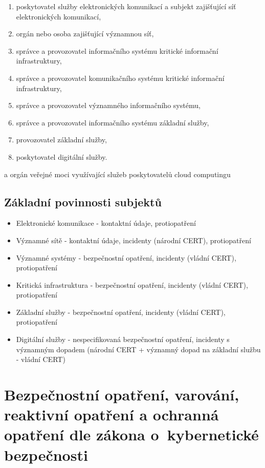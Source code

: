 \begin{enumerate}[label=\alph*)]
\item poskytovatel služby elektronických komunikací a subjekt zajišťující síť elektronických komunikací,
\item orgán nebo osoba zajišťující významnou síť,
\item správce a provozovatel informačního systému kritické informační infrastruktury,
\item správce a provozovatel komunikačního systému kritické informační infrastruktury,
\item správce a provozovatel významného informačního systému,
\item správce a provozovatel informačního systému základní služby,
\item provozovatel základní služby,
\item poskytovatel digitální služby.
\end{enumerate}

a orgán veřejné moci využívající služeb poskytovatelů cloud computingu

\subsection{Základní povinnosti subjektů}
\begin{itemize}
    \item Elektronické komunikace - kontaktní údaje, protiopatření
    \item Významné sítě - kontaktní údaje, incidenty (národní CERT), protiopatření
    \item Významné systémy - bezpečnostní opatření, incidenty (vládní CERT), protiopatření
    \item Kritická infrastruktura - bezpečnostní opatření, incidenty (vládní CERT), protiopatření
    \item Základní služby - bezpečnostní opatření, incidenty (vládní CERT), protiopatření
    \item Digitální služby - nespecifikovaná bezpečnostní opatření, incidenty s významným dopadem (národní CERT + významný dopad na základní službu - vládní CERT)
\end{itemize}

\clearpage
\section{Bezpečnostní opatření, varování, reaktivní opatření a ochranná opatření dle zákona o~kybernetické bezpečnosti}

